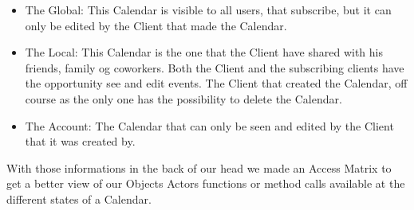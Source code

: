 \begin{itemize}
	\item The Global: This Calendar is visible to all users, that subscribe, but it can only be edited by the Client that made the Calendar.
	\item The Local: This Calendar is the one that the Client have shared with his friends, family og coworkers. Both the Client and the subscribing clients have the opportunity see and edit events. The Client that created the Calendar, off course as the only one has the possibility to delete the Calendar.
	\item The Account: The Calendar that can only be seen and edited by the Client that it was created by. 
\end{itemize}

With those informations in the back of our head we made an Access Matrix to get a better view of our Objects Actors functions or method calls available at the different states of a Calendar. 

